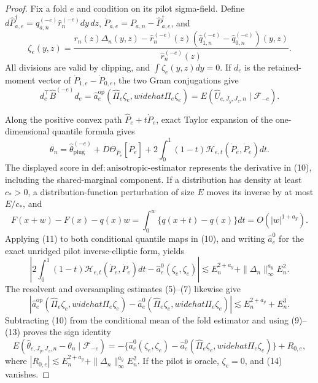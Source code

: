\documentclass{article}
\begin{document}
\begin{proof}
Fix a fold \(e\) and condition on its pilot sigma-field.  Define \(d\widehat P_{a,e}^{\dagger}=\widehat q_{a,n}^{(-e)}\widehat r_n^{(-e)}dy\,dz\), \(\dot P_{a,e}=P_{a,n}-\widehat P_{a,e}^{\dagger}\), and
\[
\zeta_e(y,z)=
\frac{r_n(z)\Delta_n(y,z)-\widehat r_n^{(-e)}(z)
(\widehat q_{1,n}^{(-e)}-\widehat q_{0,n}^{(-e)})(y,z)}
{\widehat r_n^{(-e)}(z)}. \tag{8}
\]
All divisions are valid by clipping, and \(\int\zeta_e(y,z)dy=0\).  If \(d_e\) is the retained-moment vector of \(\dot P_{1,e}-\dot P_{0,e}\), the two Gram conjugations give
\[
d_e^\top\widehat B^{(-e)}d_e
=\widehat a_e^{\mathrm{op}}(\widehat\Pi_e\zeta_e,widehat\Pi_e\zeta_e)
=E(\widehat U_{e,J_y,J_z,n}\mid\mathscr F_{-e}). \tag{9}
\]

Along the positive convex path \(\widehat P_e+t\dot P_e\), exact Taylor expansion of the one-dimensional quantile formula gives
\[
\theta_n=\widehat\theta_{\mathrm{plug}}^{(-e)}
+D\Theta_{\widehat P_e}[\dot P_e]
+2\int_0^1(1-t)\mathcal H_{e,t}(\dot P_e,\dot P_e)dt. \tag{10}
\]
The displayed score in \(\mathrm{def{:}anisotropic\text{-}estimator}\) represents the derivative in (10), including the shared-marginal component.  If a distribution has density at least \(c_*>0\), a distribution-function perturbation of size \(E\) moves its inverse by at most \(E/c_*\), and
\[
F(x+w)-F(x)-q(x)w
=\int_0^w\{q(x+t)-q(x)\}dt=O(|w|^{1+a_y}). \tag{11}
\]
Applying (11) to both conditional quantile maps in (10), and writing \(\widehat a_e^0\) for the exact unridged pilot inverse-elliptic form, yields
\[
\left|2\int_0^1(1-t)\mathcal H_{e,t}(\dot P_e,\dot P_e)dt
-\widehat a_e^0(\zeta_e,\zeta_e)\right|
\lesssim E_n^{2+a_y}+\|\Delta_n\|_\infty^{a_y}E_n^2. \tag{12}
\]
The resolvent and oversampling estimates (5)--(7) likewise give
\[
|\widehat a_e^{\mathrm{op}}(\widehat\Pi_e\zeta_e,widehat\Pi_e\zeta_e)
-\widehat a_e^0(\widehat\Pi_e\zeta_e,widehat\Pi_e\zeta_e)|
\lesssim E_n^{2+a_y}+E_n^3. \tag{13}
\]
Subtracting (10) from the conditional mean of the fold estimator and using (9)--(13) proves the sign identity
\[
E(\widehat\theta_{e,J_y,J_z,n}-\theta_n\mid\mathscr F_{-e})
=-\{\widehat a_e^0(\zeta_e,\zeta_e)
-\widehat a_e^0(\widehat\Pi_e\zeta_e,widehat\Pi_e\zeta_e)\}+R_{0,e}, \tag{14}
\]
where \(|R_{0,e}|\lesssim E_n^{2+a_y}+\|\Delta_n\|_\infty^{a_y}E_n^2\).  If the pilot is oracle, \(\zeta_e=0\), and (14) vanishes.


\end{proof}
\end{document}
